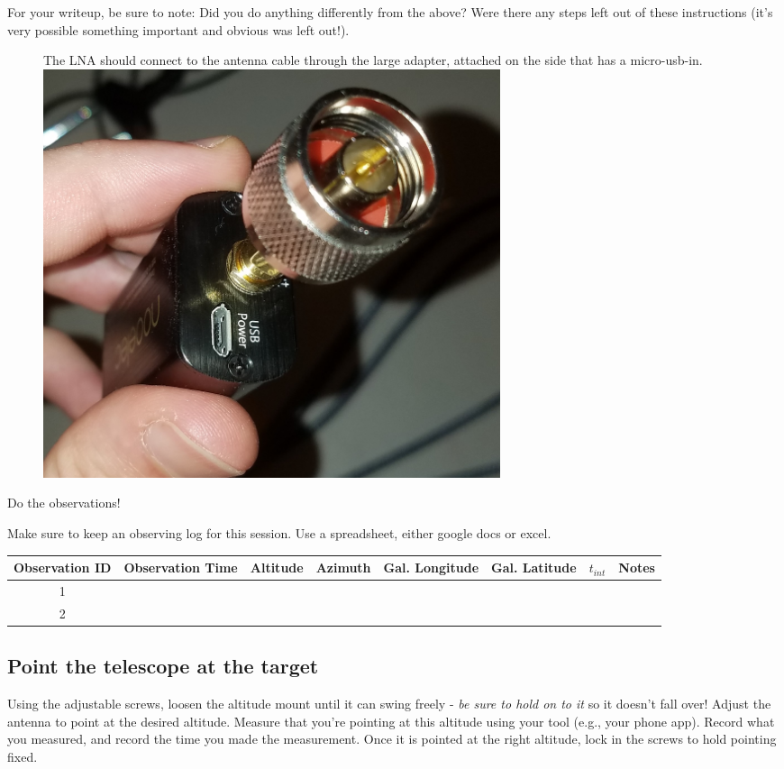 \documentclass[11pt]{article}
\begin{document}
For your writeup, be sure to note: Did you do anything differently from the above?
Were there any steps left out of these instructions (it's very possible something important
and obvious was left out!).


\begin{figure}[htp]
    \begin{minipage}{0.45\textwidth}
    \centering
        The LNA should connect to the antenna cable through the large adapter, attached on the side that has a micro-usb-in.\\
        \vspace{3mm}
    \includegraphics[width=0.65\textwidth]{RadioLabPhotos/coax_adapter_on_LNA.jpg}
    \end{minipage}
\end{figure}


\par Do the observations!

Make sure to keep an observing log for this session.  Use a spreadsheet, either google docs or excel.

\begin{tabular}{|c|c|c|c|c|c|c|c|}
\hline
Observation ID & Observation Time & Altitude & Azimuth &  Gal. Longitude & Gal. Latitude  & $t_{int}$ & Notes \\
\hline
 1  & & & & & & & \\
 \hline
 2  & & & & & & & \\
 \hline
\end{tabular}

\subsection{Point the telescope at the target}
\label{sec:point}
Using the adjustable screws, loosen the altitude mount until it can swing freely - \emph{be sure to hold on to it} so it doesn't fall over!
Adjust the antenna to point at the desired altitude.
Measure that you're pointing at this altitude using your tool (e.g., your phone app).
Record what you measured, and record the time you made the measurement.
Once it is pointed at the right altitude, lock in the screws to hold pointing fixed.
\end{document}
